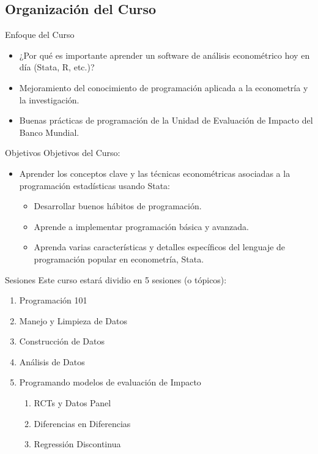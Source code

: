 \documentclass[11pt, aspectratio=169, compress]{beamer}
\begin{document}
\subsection{Organización del Curso}
\begin{frame}{Enfoque del Curso}
	\begin{itemize}
		\item ¿Por qué es importante aprender un software de análisis econométrico hoy en día (Stata, R, etc.)? 
		\item Mejoramiento del conocimiento de programación aplicada a la econometría y la investigación.
		\item Buenas prácticas de programación de la Unidad de Evaluación de Impacto del Banco Mundial.
	\end{itemize}
\end{frame}
\begin{frame}{Objetivos}
	Objetivos del Curso: 
	\begin{itemize}
		\item Aprender los conceptos clave y las técnicas econométricas asociadas a la programación estadísticas usando Stata:
		\begin{itemize}
			\item Desarrollar buenos hábitos de programación.
			\item Aprende a implementar programación básica y avanzada.
			\item Aprenda varias características y detalles específicos del lenguaje de programación popular en econometría, Stata.
		\end{itemize}

	\end{itemize}
\end{frame}
\begin{frame}{Sesiones}
	Este curso estará dividio en 5 sesiones (o tópicos):
	\begin{enumerate}
		\item Programación 101
		\item Manejo y Limpieza de Datos
		\item Construcción de Datos
		\item Análisis de Datos
		\item Programando modelos de evaluación de Impacto
		\begin{enumerate}
			\item RCTs y Datos Panel
			\item Diferencias en Diferencias
			\item Regressión Discontinua
		\end{enumerate}
	\end{enumerate}	
\end{frame}
\end{document}
